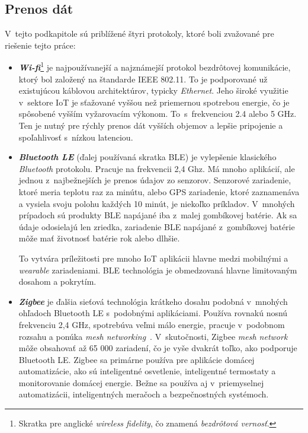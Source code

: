 \subsection{Prenos dát}\label{iot-trasport}
V~tejto podkapitole sú priblížené štyri protokoly, ktoré boli zvažované pre riešenie tejto práce:
\begin{itemize}
    \item \textit{\textbf{Wi-fi}}\footnote{Skratka pre anglické \emph{wireless fidelity}, čo znamená \emph{bezdrôtová vernosť}.} je najpoužívanejší a najznámejší protokol bezdrôtovej komunikácie, ktorý bol založený na štandarde IEEE 802.11. 
    To je podporované už existujúcou káblovou architektúrov, typicky \emph{Ethernet}. 
    Jeho široké využitie v~sektore IoT je sťažované vyššou než priemernou spotrebou energie, čo je spôsobené vyšším vyžarovacím výkonom. 
    To~s~frekvenciou 2.4 alebo 5 GHz. 
    Ten je nutný pre rýchly prenos dát vyšších objemov a lepšie pripojenie a spoľahlivosť s~nízkou latenciou.~\cite{elkhodr2016emerging}
    
    \item \textit{\textbf{Bluetooth LE}} (ďalej používaná skratka BLE) je vylepšenie klasického \emph{Bluetooth} protokolu. 
    Pracuje na frekvencii 2,4 Ghz. 
    Má mnoho aplikácií, ale jednou z~najbežnejších je prenos údajov zo senzorov. 
    Senzorové zariadenie, ktoré meria teplotu raz za minútu, alebo GPS zariadenie, ktoré zaznamenáva a vysiela svoju polohu každých 10 minút, je niekoľko príkladov. 
    V~mnohých prípadoch sú produkty BLE napájané iba z~malej gombíkovej batérie. 
    Ak sa údaje odosielajú len zriedka, zariadenie BLE napájané z~gombíkovej batérie môže mať životnosť batérie rok alebo dlhšie.~\cite{elkhodr2016emerging}

    To vytvára príležitosti pre mnoho IoT aplikácii hlavne medzi mobilnými a \emph{wearable} zariadeniami.
    BLE technológia je obmedzovaná hlavne limitovaným dosahom a pokrytím.~\cite{s17071467}\newpage

    \item \textit{\textbf{Zigbee}} je ďalšia sieťová technológia krátkeho dosahu podobná v~mnohých ohľadoch Bluetooth LE s~podobnými aplikáciami. 
    Používa rovnakú nosnú frekvenciu 2,4 GHz, spotrebúva veľmi málo energie, pracuje v~podobnom rozsahu a ponúka \textit{mesh networking}~\cite{elkhodr2016emerging}. 
    V~skutočnosti, Zigbee \textit{mesh network} môže obsahovať až 65 000 zariadení, čo je vyše dvakrát toľko, ako podporuje Bluetooth LE. 
    Zigbee sa primárne používa pre aplikácie domácej automatizácie, ako sú inteligentné osvetlenie, inteligentné termostaty a monitorovanie domácej energie. 
    Bežne sa používa aj v~priemyselnej automatizácii, inteligentných meračoch a bezpečnostných systémoch.~\cite{5942102}


\end{itemize}
